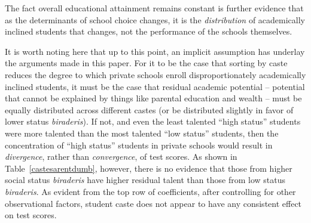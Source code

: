 \documentclass[Eubank_pk_ethnic_sorting.tex]{subfiles}
\begin{document}


The fact overall educational attainment remains constant is further evidence that as the determinants of school choice changes, it is the \emph{distribution} of academically inclined students that changes, not the performance of the schools themselves. 

It is worth noting here that up to this point, an implicit assumption has underlay the arguments made in this paper. For it to be the case that sorting by caste reduces the degree to which private schools enroll disproportionately academically inclined students, it must be the case that residual academic potential -- potential that cannot be explained by things like parental education and wealth -- must be equally distributed across different castes (or be distributed slightly in favor of lower status \emph{biraderis}). If not, and even the least talented ``high status'' students were more talented than the most talented ``low status'' students, then the concentration of ``high status'' students in private schools would result in \emph{divergence}, rather than \emph{convergence}, of test scores. As shown in Table~\ref{castesarentdumb}, however, there is no evidence that those from higher social status \emph{biraderis} have higher residual talent than those from low status \emph{biraderis}. As evident from the top row of coefficients, after controlling for other observational factors, student caste does not appear to have any consistent effect on test scores. 


\end{document}
